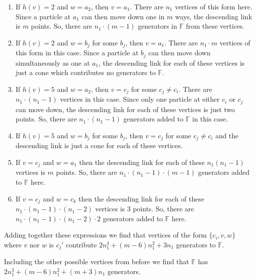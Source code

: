 \begin{enumerate}
    \item If \(h(v) = 2\) and \(w = a_2\), then \(v = a_1\). There are \(n_1\) vertices of this form here.
    Since a particle at \(a_1\) can then move down one in \(m\) ways, the descending link is \(m\) points.
    So, there are \(n_1 \cdot (m - 1)\) generators in \(\mathbb{F}\) from these vertices.

    \item If \(h(v) = 2\) and \(w = b_j\) for some \(b_j\), then \(v = a_1\). 
    There are \(n_1 \cdot m\) vertices of this form in this case. Since a particle at \(b_j\) can then move down simultaneously 
    as one at \(a_1\), the descending link for each of these vertices is just a cone which contributes no generators to \(\mathbb{F}\).

    \item If \(h(v) = 5\) and \(w = a_2\), then \(v = c_j\) for some \(c_j\neq c_i\). 
        There are \(n_1 \cdot(n_1 - 1)\) vertices in this case.
    Since only one particle at either \(c_i\) or \(c_j\) can move down, the descending link for each of these vertices is just two points.
    So, there are \(n_1 \cdot(n_1 - 1)\) generators added to \(\mathbb{F}\) in this case.

    \item If \(h(v) = 5\) and \(w = b_j\) for some \(b_j\), then \(v = c_j\) for some \(c_j \neq c_i\) and the descending link is just a cone for each of these vertices.

    \item If \(v = c_j\) and \(w = a_1\) then the descending link for each of these \(n_1 (n_1 - 1)\) vertices is \(m\) points.
    So, there are \(n_1 \cdot (n_1 - 1) \cdot (m - 1)\) generators added to \(\mathbb{F}\) here.

    \item If \(v = c_j\) and \(w = c_k\) then the descending link for each of these \(n_1\cdot(n_1 - 1)\cdot (n_1 - 2)\) vertices is \(3\) points.
        So, there are \(n_1\cdot(n_1 - 1)\cdot (n_1 - 2) \cdot 2\) generators added to \(\mathbb{F}\) here.
\end{enumerate}
Adding together these expressions we find that vertices of the form \(\{c_i, v, w\}\) where \(v\) nor \(w\) is \(c_j'\)
contribute \(2n_1^3 + (m - 6)n_1^2 + 3n_1\) generators to \(\mathbb{F}\).

Including the other possible vertices from before we find that \(\mathbb{F}\) has
\(2n_1^3 + (m - 6)n_1^2 + (m + 3)n_1\) generators.

